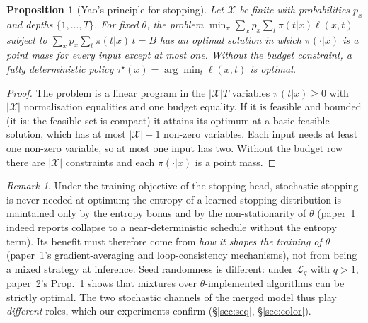 \documentclass[10pt]{article}
\newtheorem{proposition}{Proposition}
\theoremstyle{definition}
\theoremstyle{remark}
\newtheorem{remark}{Remark}
\newcommand{\Lq}{\mathcal{L}_q}
\begin{document}
\begin{proposition}[Yao's principle for stopping]\label{prop:yao}
Let $\mathcal X$ be finite with probabilities $p_x$ and depths $\{1,\dots,T\}$.  For fixed $\theta$, the problem
$\min_\pi\sum_x p_x\sum_t\pi(t|x)\ell(x,t)$ subject to $\sum_x p_x\sum_t\pi(t|x)\,t=B$ has an optimal solution in
which $\pi(\cdot|x)$ is a point mass for every input except at most one.  Without the budget constraint, a fully
deterministic policy $\tau^\star(x)=\arg\min_t\ell(x,t)$ is optimal.
\end{proposition}
\begin{proof}
The problem is a linear program in the $|\mathcal X|T$ variables $\pi(t|x)\ge0$ with $|\mathcal X|$ normalisation
equalities and one budget equality.  If it is feasible and bounded (it is: the feasible set is compact) it attains
its optimum at a basic feasible solution, which has at most $|\mathcal X|+1$ non-zero variables.  Each input needs
at least one non-zero variable, so at most one input has two.  Without the budget row there are $|\mathcal X|$
constraints and each $\pi(\cdot|x)$ is a point mass.
\end{proof}
\begin{remark}
Under the training objective of the stopping head, stochastic stopping is never needed at optimum; the entropy
of a learned stopping distribution is maintained only by the entropy bonus and by the non-stationarity of $\theta$
(paper~1 indeed reports collapse to a near-deterministic schedule without the entropy term).  Its benefit must
therefore come from \emph{how it shapes the training of $\theta$} (paper~1's gradient-averaging and
loop-consistency mechanisms), not from being a mixed strategy at inference.  Seed randomness is different:
under $\Lq$ with $q>1$, paper~2's Prop.~1 shows that mixtures over $\theta$-implemented algorithms can be strictly
optimal.  The two stochastic channels of the merged model thus play \emph{different} roles, which our
experiments confirm (\S\ref{sec:seq}, \S\ref{sec:color}).
\end{remark}
\end{document}
